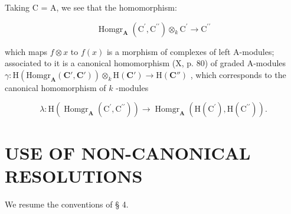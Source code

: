 Taking C = A, we see that the homomorphism:

\[
\operatorname{Homgr} _ {\mathbf {A}} \left(\mathrm{C} ^ {\prime}, \mathrm{C} ^ {\prime \prime}\right) \otimes_ {k} \mathrm{C} ^ {\prime} \rightarrow \mathrm{C} ^ {\prime \prime}\tag{18}
\]

which maps \(f \otimes x\) to \(f(x)\) is a morphism of complexes of left A-modules; associated to it is a canonical homomorphism (X, p. 80) of graded A-modules \(\gamma : \mathrm{H}(\mathrm{Homgr}_{\mathbf{A}}(\mathbf{C}', \mathbf{C}')) \otimes_k \mathrm{H}(\mathbf{C}') \to \mathrm{H}(\mathbf{C}'')\) , which corresponds to the canonical homomorphism of \(k\) -modules

\[
\lambda : \mathrm{H} (\operatorname{Homgr} _ {\mathbf {A}} \left(\mathrm{C} ^ {\prime}, \mathrm{C} ^ {\prime \prime}\right)) \rightarrow \operatorname{Homgr} _ {\mathbf {A}} \left(\mathrm{H} (\mathrm{C} ^ {\prime}), \mathrm{H} (\mathrm{C} ^ {\prime \prime})\right).
\]

\section{USE OF NON-CANONICAL RESOLUTIONS}

We resume the conventions of § 4.
